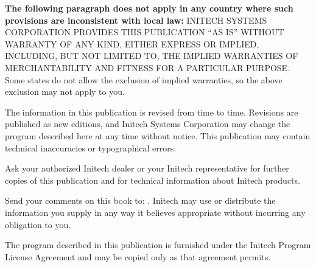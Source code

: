 \begin{TitleVerso}
{\imLegalFont
\textbf{The following paragraph does not apply in any country where such
provisions are inconsistent with local law:} INITECH SYSTEMS CORPORATION
PROVIDES THIS PUBLICATION ``AS IS'' WITHOUT WARRANTY OF ANY KIND, EITHER
EXPRESS OR IMPLIED, INCLUDING, BUT NOT LIMITED TO, THE IMPLIED WARRANTIES OF
MERCHANTABILITY AND FITNESS FOR A PARTICULAR PURPOSE.  Some states do not
allow the exclusion of implied warranties, so the above exclusion may not
apply to you.\par
The information in this publication is revised from time to time.
Revisions are published as new editions, and Initech Systems Corporation
may change the program described here at any time without notice.  This
publication may contain technical inaccuracies or typographical errors.\par
Ask your authorized Initech dealer or your Initech representative for
further copies of this publication and for technical information about
Initech products.\par}

{\footnotesize
Send your comments on this book to: \InitechAddressLine.
Initech may use or distribute the information you supply in any way it
believes appropriate without incurring any obligation to you.\par
The program described in this publication is furnished under the Initech
Program License Agreement and may be copied only as that agreement
permits.\par}
\end{TitleVerso}
